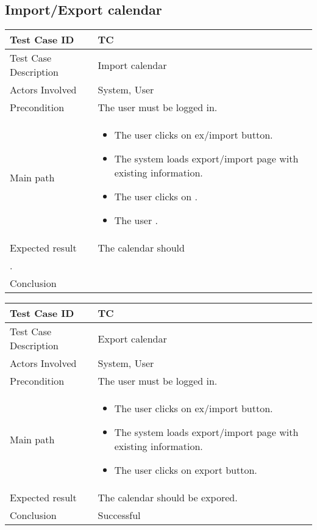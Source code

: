 \newpage
\subsection{Import/Export calendar}

\begin{center} \begin{tabular}{|l|l|}
  \hline
  Test Case ID & TC \z\\
  \hline
  Test Case Description & Import calendar \\
  \hline
  Actors Involved & System, User\\
   \hline
  Precondition &The user must be logged in.         \\
  \hline
  Main path &   \begin{minipage}{5in}
    \vskip 4pt
            \begin{itemize}
              \item The user clicks on ex/import button.
              \item The system loads export/import page with existing information.
              \item The user clicks on .
              \item The user .
            \end{itemize}
    \vskip 4pt
  \end{minipage}  \\
  \hline
  Expected result & The calendar should \\
  .\\
  \hline
  Conclusion & \\
  \hline
\end{tabular} \end{center}

\begin{center} \begin{tabular}{|l|l|}
  \hline
  Test Case ID & TC \z\\
  \hline
  Test Case Description & Export calendar \\
  \hline
  Actors Involved & System, User\\
   \hline
  Precondition & The user must be logged in.\\
  \hline
  Main path &   \begin{minipage}{5in}
    \vskip 4pt
            \begin{itemize}
              \item The user clicks on ex/import button.
              \item The system loads export/import page with existing information.
              \item The user clicks on export button.
            \end{itemize}
    \vskip 4pt
  \end{minipage}  \\
  \hline
  Expected result & The calendar should be expored.\\
  \hline
  Conclusion & Successful\\
  \hline
\end{tabular} \end{center}
